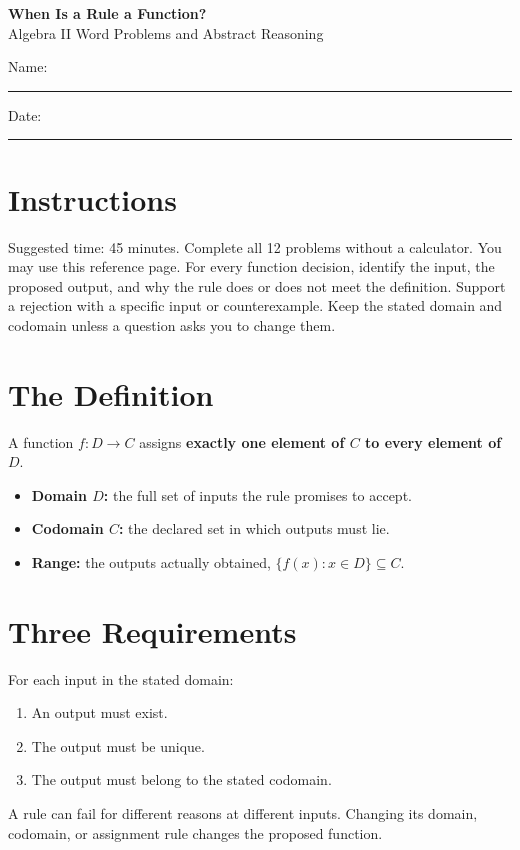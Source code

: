 \documentclass[11pt]{article}
\begin{document}
\begin{center}
  {\Large\textbf{When Is a Rule a Function?}}\\[3pt]
  {\large Algebra II Word Problems and Abstract Reasoning}
\end{center}

Name: \rule{2.7in}{0.4pt}\hfill Date: \rule{1.5in}{0.4pt}

\section*{Instructions}
Suggested time: 45 minutes. Complete all 12 problems without a calculator.
You may use this reference page. For every function decision, identify the
input, the proposed output, and why the rule does or does not meet the
definition. Support a rejection with a specific input or counterexample.
Keep the stated domain and codomain unless a question asks you to change them.

\begingroup
\small
\section*{The Definition}
A function $f:D\to C$ assigns \textbf{exactly one element of $C$ to every
element of $D$}.
\begin{itemize}[leftmargin=*,itemsep=0.3em]
  \item \textbf{Domain $D$:} the full set of inputs the rule promises to accept.
  \item \textbf{Codomain $C$:} the declared set in which outputs must lie.
  \item \textbf{Range:} the outputs actually obtained,
  $\{f(x):x\in D\}\subseteq C$.
\end{itemize}

\section*{Three Requirements}
For each input in the stated domain:
\begin{enumerate}[leftmargin=*,itemsep=0.3em]
  \item An output must exist.
  \item The output must be unique.
  \item The output must belong to the stated codomain.
\end{enumerate}
A rule can fail for different reasons at different inputs. Changing its domain,
codomain, or assignment rule changes the proposed function.
\end{document}
